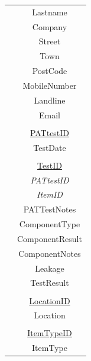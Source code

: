 \begin{center}
\begin{tabular}{|c|c|}
                                   & Lastname                      \\ 
                                   & Company                       \\ 
                                   & Street                        \\ 
                                   & Town                          \\ 
                                   & PostCode                      \\ 
                                   & MobileNumber                  \\ 
                                   & Landline                      \\ 
                                   & Email                         \\ 
                                   &				                \\
                                   & \underline{PATtestID}         \\
                                   & TestDate                      \\   
                                   &				                \\
                                   & \underline{TestID}            \\
                                   & \emph{PATtestID}              \\
                                   & \emph{ItemID}	                \\
                                   & PATTestNotes                  \\
                                   & ComponentType                 \\
                                   & ComponentResult               \\
                                   & ComponentNotes                \\
                                   & Leakage                       \\ 
                                   & TestResult                    \\ 
                                   &                               \\
                                   & \underline{LocationID}        \\
                                   & Location                      \\
                                   &                               \\
                                   & \underline{ItemTypeID}        \\
                                   & ItemType                      \\ \hline                                
    \end{tabular}
\end{center}

